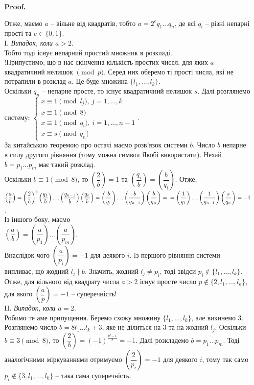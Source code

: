 \documentclass[a4paper, 10pt]{article}
\makeatletter
\theoremstyle{theoremdd}
\theoremstyle{theoremdd}
\theoremstyle{theoremdd}
\theoremstyle{theoremdd}
\theoremstyle{theoremdd}
\theoremstyle{theoremdd}
\theoremstyle{theoremdd}
\theoremstyle{theoremdd}
\renewenvironment{proof}[1][Proof.\\]{\par
\pushQED{\hfill \qed}%
\normalfont \topsep6\p@\@plus6\p@\relax
\trivlist
\item\relax
{\bfseries
#1\@addpunct{.}}\hspace\labelsep\ignorespaces
}{%
\popQED\endtrivlist\@endpefalse
}
\makeatother
\begin{document}
\begin{proof}
Отже, маємо $a$ -- вільне від квадратів, тобто $a = 2^e q_1 \dots q_n$, де всі $q_i$ -- різні непарні прості та $e \in \{0,1\}$.\\
I. \textit{Випадок, коли $a > 2$.}\\
Тобто тоді існує непарний простий множник в розкладі.\\
!Припустимо, що в нас скінченна кількість простих чисел, для яких $a$ -- квадратичний нелишок $\pmod p$. Серед них оберемо ті прості числа, які не потрапили в розклад $a$. Це буде множина $\{l_1,\dots,l_k\}$.\\
Оскільки $q_n$ -- непарне просте, то існує квадратичний нелишок $s$. Далі розглянемо систему:
$\begin{cases}
x \equiv 1 \pmod {l_j},\ j = 1,\dots,k \\
x \equiv 1 \pmod {8} \\
x \equiv 1 \pmod {q_i},\ i = 1,\dots,n-1 \\
x \equiv s \pmod {q_n}
\end{cases}$.\\
За китайською теоремою про остачі маємо розв'язок системи $b$. Число $b$ непарне в силу другого рівняння (тому можна символ Якобі використати). Нехай $b = p_1 \dots p_m$ має такий розклад.\\
Оскільки $b \equiv 1 \pmod {8}$, то $\left( \dfrac{2}{b} \right) = 1$ та $\left( \dfrac{q_i}{b} \right) = \left( \dfrac{b}{q_i} \right)$. Отже,\\
$\left( \dfrac{a}{b}\right) = \left( \dfrac{2}{b} \right)^e \left( \dfrac{q_1}{b}\right) \dots \left( \dfrac{q_{n-1}}{b} \right) \left( \dfrac{q_n}{b} \right) = \left( \dfrac{b}{q_1} \right) \dots \left( \dfrac{b}{q_{n-1}} \right) \left( \dfrac{b}{q_n} \right) =
\\ = \left( \dfrac{1}{q_1} \right) \dots \left( \dfrac{1}{q_{n-1}} \right) \left( \dfrac{s}{q_n} \right) = -1$.\\
Із іншого боку, маємо\\
$\left( \dfrac{a}{b} \right) = \left( \dfrac{a}{p_1} \right) \dots \left( \dfrac{a}{p_m} \right)$.\\
Внаслідок чого $\left( \dfrac{a}{p_i} \right) = -1$ для деякого $i$. Із першого рівняння системи випливає, що жодний $l_j \nmid b$. Значить, жодний $l_j \neq p_i$, тоді звідси $p_i \notin \{l_1,\dots,l_k\}$.\\
Отже, для вільного від квадрату числа $a > 2$ існує просте число $p \notin \{2,l_1,\dots,l_k\}$, для якого $\left( \dfrac{a}{p} \right) = -1$ -- суперечність!
\bigskip \\
II. \textit{Випадок, коли $a = 2$.}\\
Робимо те аме припущення. Беремо схожу множину $\{l_1,\dots,l_k\}$, але викинемо $3$. Розглянемо число $b = 8 l_1 \dots l_k + 3$, яке не ділиться на $3$ та на жодний $l_j$. Оскільки $b \equiv 3 \pmod 8$, то $\left( \dfrac{2}{b}\right) = (-1)^{\frac{b^2-1}{8}} = -1$. Далі розкладемо $b = p_1 \dots p_m$. Тоді аналогічними міркуваннями отримуємо $\left( \dfrac{2}{p_i} \right) = -1$ для деякого $i$, тому так само $p_i \notin \{3,l_1,\dots,l_k\}$ -- така сама суперечність. 
\end{proof}
\end{document}
